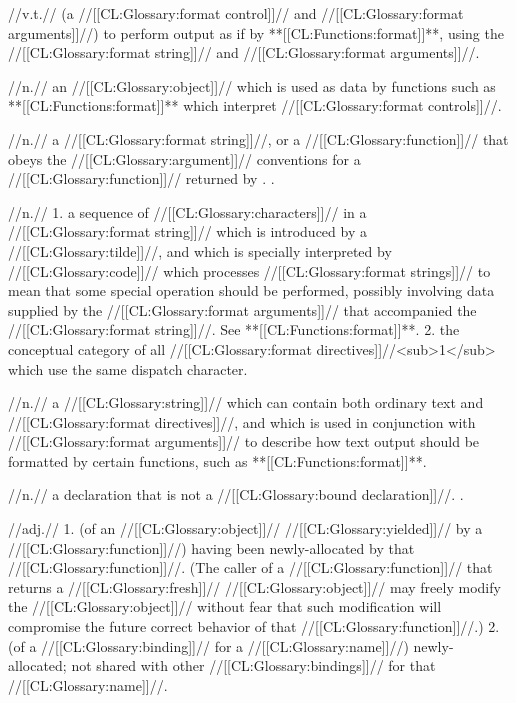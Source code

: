  //v.t.// (a //[[CL:Glossary:format control]]// and //[[CL:Glossary:format arguments]]//) to perform output as if by **[[CL:Functions:format]]**, using the //[[CL:Glossary:format string]]// and //[[CL:Glossary:format arguments]]//.

 //n.// an //[[CL:Glossary:object]]// which is used as data by functions such as **[[CL:Functions:format]]** which interpret //[[CL:Glossary:format controls]]//.

 //n.// a //[[CL:Glossary:format string]]//, or a //[[CL:Glossary:function]]// that obeys the //[[CL:Glossary:argument]]// conventions for a //[[CL:Glossary:function]]// returned by . \Seesection\CompilingFormatStrings.

 //n.// 1. a sequence of //[[CL:Glossary:characters]]// in a //[[CL:Glossary:format string]]// which is introduced by a //[[CL:Glossary:tilde]]//, and which is specially interpreted by //[[CL:Glossary:code]]// which processes //[[CL:Glossary:format strings]]// to mean that some special operation should be performed, possibly involving data supplied by the //[[CL:Glossary:format arguments]]// that accompanied the //[[CL:Glossary:format string]]//. See **[[CL:Functions:format]]**.  2. the conceptual category of all //[[CL:Glossary:format directives]]//<sub>1</sub> which use the same dispatch character. 

 //n.// a //[[CL:Glossary:string]]// which can contain both ordinary text and //[[CL:Glossary:format directives]]//, and which is used in conjunction with //[[CL:Glossary:format arguments]]// to describe how text output should be formatted by certain functions, such as **[[CL:Functions:format]]**.

 //n.// a declaration that is not a //[[CL:Glossary:bound declaration]]//. .
 
 //adj.// 1. (of an //[[CL:Glossary:object]]// //[[CL:Glossary:yielded]]// by a //[[CL:Glossary:function]]//) having been newly-allocated by that //[[CL:Glossary:function]]//. (The caller of a //[[CL:Glossary:function]]// that returns a //[[CL:Glossary:fresh]]// //[[CL:Glossary:object]]// may freely modify the //[[CL:Glossary:object]]// without fear that such modification will compromise the future correct behavior of that //[[CL:Glossary:function]]//.) 2. (of a //[[CL:Glossary:binding]]// for a //[[CL:Glossary:name]]//) newly-allocated; not shared with other //[[CL:Glossary:bindings]]// for that //[[CL:Glossary:name]]//.


